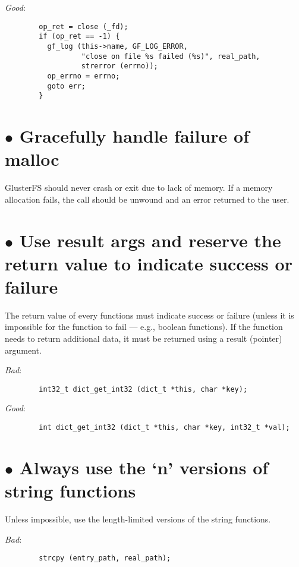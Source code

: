 \documentclass{article}[12pt]
\begin{document}
\textsl{Good}:

\begin{verbatim}
        op_ret = close (_fd);
        if (op_ret == -1) {
          gf_log (this->name, GF_LOG_ERROR, 
                  "close on file %s failed (%s)", real_path, 
                  strerror (errno));
          op_errno = errno;
          goto err;
        }
\end{verbatim}


\section*{$\bullet$ Gracefully handle failure of malloc}
GlusterFS should never crash or exit due to lack of memory. If a memory allocation
fails, the call should be unwound and an error returned to the user.

\section*{$\bullet$ Use result args and reserve the return value to indicate success or failure}
The return value of every functions must indicate success or failure (unless 
it is impossible for the function to fail --- e.g., boolean functions). If 
the function needs to return additional data, it must be returned using a 
result (pointer) argument.

\vspace{2ex}
\textsl{Bad}:

\begin{verbatim}
        int32_t dict_get_int32 (dict_t *this, char *key);
\end{verbatim}

\textsl{Good}:

\begin{verbatim}
        int dict_get_int32 (dict_t *this, char *key, int32_t *val);
\end{verbatim}

\section*{$\bullet$ Always use the `n' versions of string functions}
Unless impossible, use the length-limited versions of the string functions.

\vspace{2ex}
\textsl{Bad}:

\begin{verbatim}
        strcpy (entry_path, real_path);
\end{verbatim}
\end{document}
